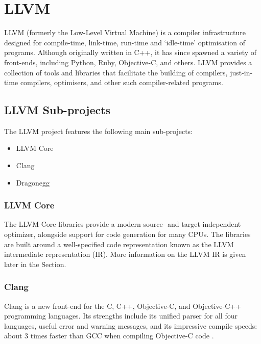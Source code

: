\section{LLVM}
\label{sec:llvm}

LLVM (formerly the Low-Level Virtual Machine\footnotemark {}) is a compiler infrastructure designed for compile-time, link-time, run-time and `idle-time' optimisation of programs.  Although originally written in C++, it has since spawned a variety of front-ends, including Python, Ruby, Objective-C, and others. LLVM provides a collection of tools and libraries that facilitate the building of compilers, just-in-time compilers, optimisers, and other such compiler-related programs.

\subsection*{LLVM Sub-projects}

The LLVM project features the following main sub-projects:

\begin{itemize}
\item LLVM Core
\item Clang
\item Dragonegg
\end{itemize}

\subsubsection*{LLVM Core}

The LLVM Core libraries provide a modern source- and target-independent optimizer, alongside support for code generation for many CPUs. The libraries are built around a well-specified code representation known as the LLVM intermediate representation (IR). More information on the LLVM IR is given later in the Section.

\subsubsection*{Clang}

Clang is a new front-end for the C, C++, Objective-C, and Objective-C++ programming languages. Its strengths include its unified parser for all four languages, useful error and warning messages, and its impressive compile speeds: about 3 times faster than GCC when compiling Objective-C code \cite{clang_performance}.

